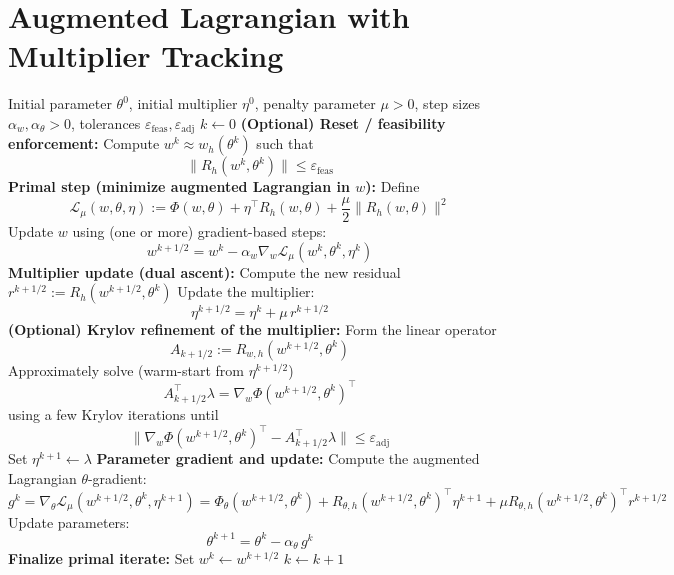 \section{Augmented Lagrangian with Multiplier Tracking}

\begin{algorithm}[htp!]
\caption{Augmented Lagrangian Adjoint Tracking (Option C)}
\label{alg:optionC-al}
\begin{algorithmic}[1]
\Require Initial parameter $\theta^{0}$, initial multiplier $\eta^{0}$, penalty parameter $\mu>0$, step sizes $\alpha_w,\alpha_\theta>0$, tolerances $\varepsilon_{\text{feas}},\varepsilon_{\text{adj}}$
\State $k \leftarrow 0$
    \State \textbf{(Optional) Reset / feasibility enforcement:}
    \State \quad Compute $w^{k} \approx w_h(\theta^{k})$ such that
    \[
        \|R_h(w^{k},\theta^{k})\| \le \varepsilon_{\text{feas}}
    \]
    \State \textbf{Primal step (minimize augmented Lagrangian in $w$):}
    \State \quad Define
    \[
        \mathcal{L}_\mu(w,\theta,\eta)
        :=
        \Phi(w,\theta)
        + \eta^\top R_h(w,\theta)
        + \frac{\mu}{2}\|R_h(w,\theta)\|^2
    \]
    \State \quad Update $w$ using (one or more) gradient-based steps:
    \[
        w^{k+1/2} = w^{k} - \alpha_w \nabla_w \mathcal{L}_\mu(w^{k},\theta^{k},\eta^{k})
    \]
    \State \textbf{Multiplier update (dual ascent):}
    \State \quad Compute the new residual $r^{k+1/2} := R_h(w^{k+1/2},\theta^{k})$
    \State \quad Update the multiplier:
    \[
        \eta^{k+1/2} = \eta^{k} + \mu\, r^{k+1/2}
    \]
    \State \textbf{(Optional) Krylov refinement of the multiplier:}
    \State \quad Form the linear operator
    \[
        A_{k+1/2} := R_{w,h}(w^{k+1/2},\theta^{k})
    \]
    \State \quad Approximately solve (warm-start from $\eta^{k+1/2}$)
    \[
        A_{k+1/2}^\top \lambda = \nabla_w \Phi(w^{k+1/2},\theta^{k})^\top
    \]
    using a few Krylov iterations until
    \[
        \|\nabla_w \Phi(w^{k+1/2},\theta^{k})^\top - A_{k+1/2}^\top \lambda\| \le \varepsilon_{\text{adj}}
    \]
    \State \quad Set $\eta^{k+1} \leftarrow \lambda$
    \State \textbf{Parameter gradient and update:}
    \State \quad Compute the augmented Lagrangian $\theta$-gradient:
    \[
        g^{k}
        =
        \nabla_\theta \mathcal{L}_\mu(w^{k+1/2},\theta^{k},\eta^{k+1})
        =
        \Phi_\theta(w^{k+1/2},\theta^{k})
        + R_{\theta,h}(w^{k+1/2},\theta^{k})^\top \eta^{k+1}
        + \mu R_{\theta,h}(w^{k+1/2},\theta^{k})^\top r^{k+1/2}
    \]
    \State \quad Update parameters:
    \[
        \theta^{k+1} = \theta^{k} - \alpha_\theta\, g^{k}
    \]
    \State \textbf{Finalize primal iterate:}
    \State \quad Set $w^{k} \leftarrow w^{k+1/2}$
    \State $k \leftarrow k+1$
\EndWhile
\end{algorithmic}
\end{algorithm}
